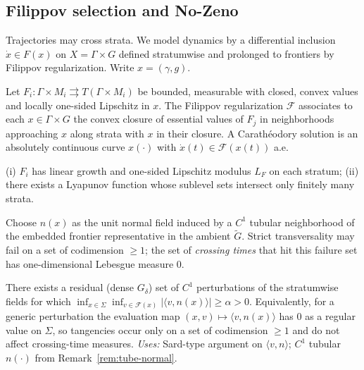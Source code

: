 \subsection{Filippov selection and No-Zeno}\label{subsec:filippov-nozeno}

Trajectories may cross strata. We model dynamics by a differential inclusion $\dot x\in F(x)$ on $X=\Gamma\times G$ defined stratumwise and prolonged to frontiers by Filippov regularization. Write $x=(\gamma,g)$.

\begin{definition}\label{def:filippov}
Let $F_i: \Gamma\times M_i\rightrightarrows T(\Gamma\times M_i)$ be bounded, measurable with closed, convex values and locally one-sided Lipschitz in $x$. The Filippov regularization $\mathcal F$ associates to each $x\in\Gamma\times G$ the convex closure of essential values of $F_j$ in neighborhoods approaching $x$ along strata with $x$ in their closure. A Carath\'eodory solution is an absolutely continuous curve $x(\cdot)$ with $\dot x(t)\in \mathcal F(x(t))$ a.e.
\end{definition}

\begin{assumption}\label{ass:nonexpl}
(i) $F_i$ has linear growth and one-sided Lipschitz modulus $L_F$ on each stratum; (ii) there exists a Lyapunov function whose sublevel sets intersect only finitely many strata.
\end{assumption}

\begin{remark}\label{rem:tube-normal}
Choose $n(x)$ as the unit normal field induced by a $C^1$ tubular neighborhood of the embedded frontier representative in the ambient $\widetilde G$. 
Strict transversality may fail on a set of codimension $\ge 1$; the set of \emph{crossing times} that hit this failure set has one-dimensional Lebesgue measure $0$.
\end{remark}

\begin{lemma}\label{lem:generic-trans}
There exists a residual (dense $G_\delta$) set of $C^1$ perturbations of the stratumwise fields for which 
$\inf_{x\in\Sigma}\inf_{v\in\mathcal F(x)}|\langle v,n(x)\rangle|\ge \alpha>0$.
Equivalently, for a generic perturbation the evaluation map $(x,v)\mapsto\langle v,n(x)\rangle$ has $0$ as a regular value on $\Sigma$, so tangencies occur only on a set of codimension $\ge1$ and do not affect crossing-time measures. 
\emph{Uses:} Sard-type argument on $\langle v,n\rangle$; $C^1$ tubular $n(\cdot)$ from Remark~\ref{rem:tube-normal}.
\end{lemma}


